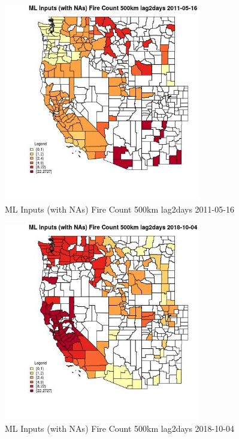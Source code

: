 \begin{figure} 
\centering  
\includegraphics[width=0.77\textwidth]{Code_Outputs/Report_ML_input_PM25_Step4_part_f_de_duplicated_aveswNAs_CountyFire_Count_500km_lag2daysMean2011-05-16.jpg} 
\caption{\label{fig:Report_ML_input_PM25_Step4_part_f_de_duplicated_aveswNAsCountyFire_Count_500km_lag2daysMean2011-05-16}ML Inputs (with NAs) Fire Count 500km lag2days 2011-05-16} 
\end{figure} 
 

\clearpage 

\begin{figure} 
\centering  
\includegraphics[width=0.77\textwidth]{Code_Outputs/Report_ML_input_PM25_Step4_part_f_de_duplicated_aveswNAs_CountyFire_Count_500km_lag2daysMean2018-10-04.jpg} 
\caption{\label{fig:Report_ML_input_PM25_Step4_part_f_de_duplicated_aveswNAsCountyFire_Count_500km_lag2daysMean2018-10-04}ML Inputs (with NAs) Fire Count 500km lag2days 2018-10-04} 
\end{figure} 
 

